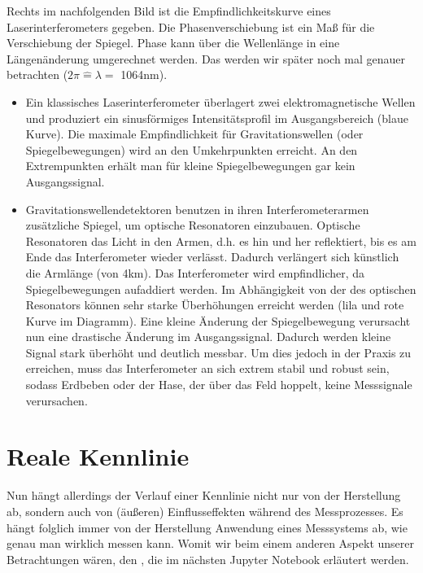 \documentclass[letterpaper,10pt,english]{jupyterBook}
\begin{document}
\sphinxAtStartPar
Rechts im nachfolgenden Bild ist die Empfindlichkeitskurve eines Laserinterferometers gegeben. Die Phasenverschiebung ist ein Maß für die Verschiebung der Spiegel. Phase kann über die Wellenlänge in eine Längenänderung umgerechnet werden. Das werden wir später noch mal genauer betrachten (\(2\pi \hat = \lambda =\) 1064nm).
\begin{itemize}
\item {} 
\sphinxAtStartPar
Ein klassisches Laserinterferometer überlagert zwei elektromagnetische Wellen und produziert ein sinusförmiges Intensitätsprofil im Ausgangsbereich (blaue Kurve). Die maximale Empfindlichkeit für Gravitationswellen (oder Spiegelbewegungen) wird an den Umkehrpunkten erreicht. An den Extrempunkten erhält man für kleine Spiegelbewegungen gar kein Ausgangssignal.

\item {} 
\sphinxAtStartPar
Gravitationswellendetektoren benutzen in ihren Interferometerarmen zusätzliche Spiegel, um optische Resonatoren einzubauen. Optische Resonatoren  das Licht in den Armen, d.h. es hin und her reflektiert, bis es am Ende das Interferometer wieder verlässt. Dadurch verlängert sich künstlich die Armlänge (von 4km). Das Interferometer wird empfindlicher, da Spiegelbewegungen aufaddiert werden. Im Abhängigkeit von der  des optischen Resonators können sehr starke Überhöhungen erreicht werden (lila und rote Kurve im Diagramm). Eine kleine Änderung der Spiegelbewegung verursacht nun eine drastische Änderung im Ausgangssignal. Dadurch werden kleine Signal stark überhöht und deutlich messbar. Um dies jedoch in der Praxis zu erreichen, muss das Interferometer an sich extrem stabil und robust sein, sodass Erdbeben oder der Hase, der über das Feld hoppelt, keine Messsignale verursachen.

\end{itemize}

\sphinxAtStartPar
{}

\sphinxstepscope


\section{Reale Kennlinie}
\label{\detokenize{content/2_realeKennlinie:reale-kennlinie}}\label{\detokenize{content/2_realeKennlinie::doc}}
\sphinxAtStartPar
Nun hängt allerdings der Verlauf einer Kennlinie nicht nur von der Herstellung ab, sondern auch von (äußeren) Einflusseffekten während des Messprozesses.
Es hängt folglich immer von der Herstellung  Anwendung eines Messsystems ab, wie genau man wirklich messen kann.
Womit wir beim einem anderen Aspekt unserer Betrachtungen wären, den , die im nächsten Jupyter Notebook erläutert werden.
\end{document}
